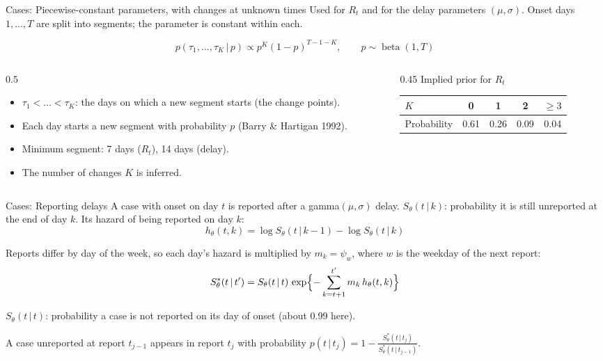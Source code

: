 \documentclass[aspectratio=169,9pt]{beamer}
\newcommand{\given}{\,|\,}
\begin{document}
\begin{frame}{Cases: Piecewise-constant parameters, with changes at unknown times}
Used for $R_t$ and for the delay parameters $(\mu,\sigma)$. Onset days
$1,\dots,T$ are split into segments; the parameter is constant within each.

\medskip
\[
p(\tau_1,\dots,\tau_K\given p)\propto p^{K}(1-p)^{T-1-K},\qquad
p\sim\operatorname{beta}(1,T)
\]

\begin{columns}[c]
\begin{column}{0.5\textwidth}
\begin{itemize}
\item $\tau_1<\dots<\tau_K$: the days on which a new segment starts (the
change points).
\item Each day starts a new segment with probability $p$ (Barry \& Hartigan
1992).
\item Minimum segment: 7 days ($R_t$), 14 days (delay).
\item The number of changes $K$ is inferred.
\end{itemize}
\end{column}
\begin{column}{0.45\textwidth}
\centering
Implied prior for $R_t$

\smallskip
\begin{tabular}{lcccc}
\toprule
$K$ & 0 & 1 & 2 & $\ge 3$ \\
\midrule
Probability & 0.61 & 0.26 & 0.09 & 0.04 \\
\bottomrule
\end{tabular}
\end{column}
\end{columns}
\end{frame}

\begin{frame}{Cases: Reporting delays}
A case with onset on day $t$ is reported after a gamma$(\mu,\sigma)$ delay.
$S_\theta(t\given k)$: probability it is still unreported at the end of day
$k$. Its hazard of being reported on day $k$:
\[
h_\theta(t,k)=\log S_\theta(t\given k-1)-\log S_\theta(t\given k)
\]

\smallskip
Reports differ by day of the week, so each day's hazard is multiplied by
$m_k=\psi_w$, where $w$ is the weekday of the next report:
\[
S^{*}_\theta(t\given t')=S_\theta(t\given t)\,
\exp\Bigl\{-\sum_{k=t+1}^{t'}m_k\,h_\theta(t,k)\Bigr\}
\]

{\small $S_\theta(t\given t)$: probability a case is not reported on its day
of onset (about 0.99 here).}

\smallskip
A case unreported at report $t_{j-1}$ appears in report $t_j$ with
probability
$\displaystyle p(t\given t_j)=1-\frac{S^{*}_\theta(t\given t_j)}{S^{*}_\theta(t\given t_{j-1})}$.
\end{frame}
\end{document}
